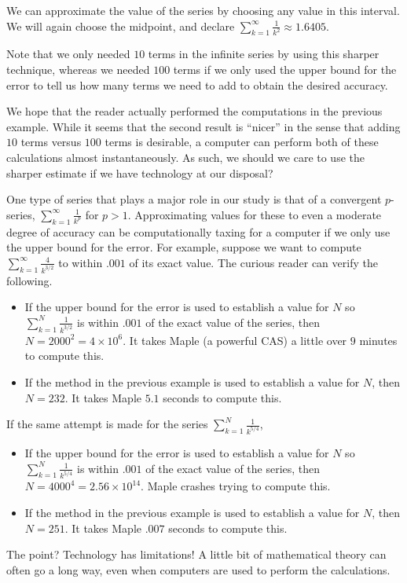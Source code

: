 \documentclass{ximera}
\begin{document}
\begin{model}
We can approximate the value of the series by choosing any value in this interval.  We will again choose the midpoint, and declare $\sum_{k=1}^{\infty} \frac{1}{k^2} \approx 1.6405$. 

Note that we only needed $10$ terms in the infinite series by using this sharper technique, whereas we needed $100$ terms if we only used the upper bound for the error to tell us how many terms we need to add to obtain the desired accuracy.
\end{model}

\begin{remark}
We hope that the reader actually performed the computations in the previous example.  While it seems that the second result is ``nicer'' in the sense that adding $10$ terms versus $100$ terms is desirable, a computer can perform both of these calculations almost instantaneously.  As such, we should we care to use the sharper estimate if we have technology at our disposal?

One type of series that plays a major role in our study is that of a convergent $p$-series, $\sum_{k=1}^{\infty} \frac{1}{k^p}$ for $p >1$.  Approximating values for these to even a moderate degree of accuracy can be computationally taxing for a computer if we only use the upper bound for the error.  For example, suppose we want to compute $\sum_{k=1}^{\infty} \frac{4}{k^{3/2}}$ to within $.001$ of its exact value.  The curious reader can verify the following.

\begin{itemize}
\item If the upper bound for the error is used to establish a value for $N$ so $\sum_{k=1}^{N} \frac{1}{k^{3/2}}$ is within $.001$ of the exact value of the series, then $N = 2000^2 = 4 \times 10^{6}$.  It takes Maple (a powerful CAS) a little over $9$ minutes to compute this.  
\item If the method in the previous example is used to establish a value for $N$, then $N=232$.   It takes Maple $5.1$ seconds to compute this.
\end{itemize}

If the same attempt is made for the series $\sum_{k=1}^{N} \frac{1}{k^{5/4}}$, 

\begin{itemize}
\item If the upper bound for the error is used to establish a value for $N$ so $\sum_{k=1}^{N} \frac{1}{k^{5/4}}$ is within $.001$ of the exact value of the series, then $N = 4000^4 = 2.56 \times 10^{14}$.  Maple crashes trying to compute this.
\item If the method in the previous example is used to establish a value for $N$, then $N=251$.   It takes Maple $.007$ seconds to compute this.
\end{itemize}

The point?  Technology has limitations!  A little bit of mathematical theory can often go a long way, even when computers are used to perform the calculations.

\end{remark}
\end{document}
